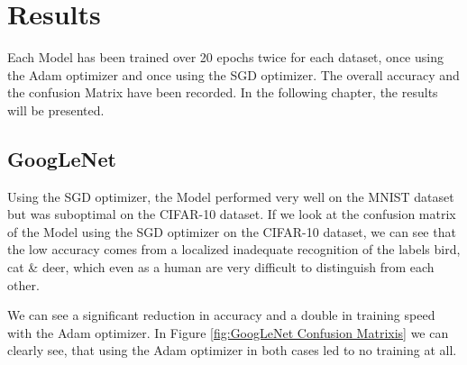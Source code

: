 \documentclass[conference]{IEEEtran}
\begin{document}
\section{Results}
Each Model has been trained over 20 epochs twice for each dataset, once using the Adam optimizer and once using the SGD optimizer. 
The overall accuracy and the confusion Matrix have been recorded. In the following chapter, the results will be presented.

\subsection{GoogLeNet}
Using the SGD optimizer, the Model performed very well on the MNIST dataset but was suboptimal on the CIFAR-10 dataset. 
If we look at the confusion matrix of the Model using the SGD optimizer on the CIFAR-10 dataset, we can see that the low accuracy comes from a localized inadequate recognition of the labels bird, cat & deer, which even as a human are very difficult to distinguish from each other.

We can see a significant reduction in accuracy and a double in training speed with the Adam optimizer.
In Figure \ref{fig:GoogLeNet Confusion Matrixis} we can clearly see, that using the Adam optimizer in both cases led to no training at all.
\end{document}
